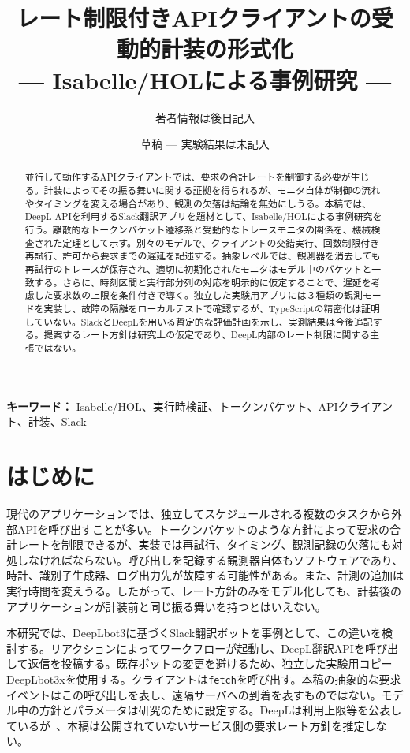 \documentclass[10pt,twocolumn]{ltjsarticle}
\title{レート制限付きAPIクライアントの受動的計装の形式化\\
--- Isabelle/HOLによる事例研究 ---}
\author{著者情報は後日記入}
\date{草稿 --- 実験結果は未記入}
\begin{document}
\maketitle
\begin{abstract}
並行して動作するAPIクライアントでは、要求の合計レートを制御する必要が生じる。計装によってその振る舞いに関する証拠を得られるが、モニタ自体が制御の流れやタイミングを変える場合があり、観測の欠落は結論を無効にしうる。本稿では、DeepL APIを利用するSlack翻訳アプリを題材として、Isabelle/HOLによる事例研究を行う。離散的なトークンバケット遷移系と受動的なトレースモニタの関係を、機械検査された定理として示す。別々のモデルで、クライアントの交錯実行、回数制限付き再試行、許可から要求までの遅延を記述する。抽象レベルでは、観測器を消去しても再試行のトレースが保存され、適切に初期化されたモニタはモデル中のバケットと一致する。さらに、時刻区間と実行部分列の対応を明示的に仮定することで、遅延を考慮した要求数の上限を条件付きで導く。独立した実験用アプリには３種類の観測モードを実装し、故障の隔離をローカルテストで確認するが、TypeScriptの精密化は証明していない。SlackとDeepLを用いる暫定的な評価計画を示し、実測結果は今後追記する。提案するレート方針は研究上の仮定であり、DeepL内部のレート制限に関する主張ではない。
\end{abstract}
\noindent\textbf{キーワード：} Isabelle/HOL、実行時検証、トークンバケット、APIクライアント、計装、Slack

\section{はじめに}
現代のアプリケーションでは、独立してスケジュールされる複数のタスクから外部APIを呼び出すことが多い。トークンバケットのような方針によって要求の合計レートを制限できるが、実装では再試行、タイミング、観測記録の欠落にも対処しなければならない。呼び出しを記録する観測器自体もソフトウェアであり、時計、識別子生成器、ログ出力先が故障する可能性がある。また、計測の追加は実行時間を変えうる。したがって、レート方針のみをモデル化しても、計装後のアプリケーションが計装前と同じ振る舞いを持つとはいえない。

本研究では、DeepLbot3に基づくSlack翻訳ボットを事例として、この違いを検討する。リアクションによってワークフローが起動し、DeepL翻訳APIを呼び出して返信を投稿する。既存ボットの変更を避けるため、独立した実験用コピーDeepLbot3xを使用する。クライアントは\texttt{fetch}を呼び出す。本稿の抽象的な要求イベントはこの呼び出しを表し、遠隔サーバへの到着を表すものではない。モデル中の方針とパラメータは研究のために設定する。DeepLは利用上限等を公表しているが~\cite{deepllimits}、本稿は公開されていないサービス側の要求レート方針を推定しない。
\end{document}
